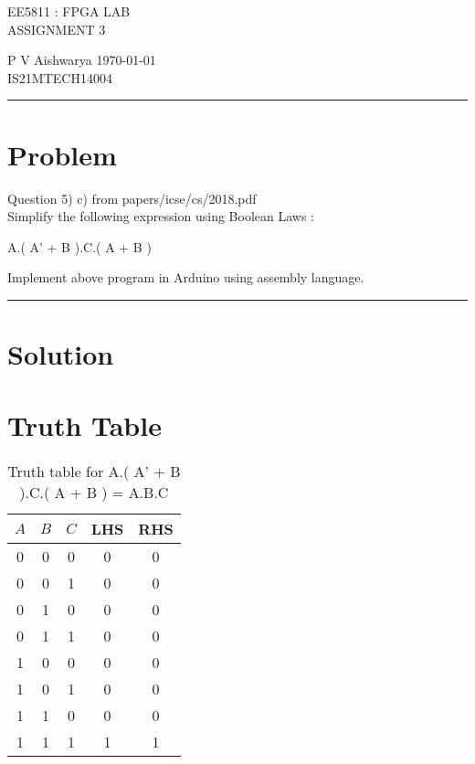 \documentclass[10pt,a4paper]{article}
\begin{document}
\begin{center}

{\huge EE5811 : FPGA LAB}\\
{\large ASSIGNMENT 3}

\end{center}
P V Aishwarya \hfill \today \\ IS21MTECH14004

\vspace{15pt}
\hrule
\vspace{5pt}


\section*{Problem}

Question 5) c) from papers/icse/cs/2018.pdf\\
Simplify the following expression using Boolean Laws :

\begin{center}
    A.( A' + B ).C.( A + B )
\end{center}

Implement above program in Arduino using assembly language.

\vspace{15pt}
\hrule
\vspace{5pt}

\section*{Solution}

\section*{Truth Table}
\begin{table}[h]
    \centering
    \begin{tabular}{|c|c|c|c|c|}
        \hline
        $A$&$B$&$C$&LHS&RHS \\
        \hline
         0&0&0&0&0 \\
         0&0&1&0&0 \\
         0&1&0&0&0 \\
         0&1&1&0&0 \\
         1&0&0&0&0 \\
         1&0&1&0&0 \\
         1&1&0&0&0 \\
         1&1&1&1&1 \\
         \hline
    \end{tabular}
    \caption{Truth table for A.( A' + B ).C.( A + B ) = A.B.C}
    \label{tab:my_label}
\end{table}
\end{document}
